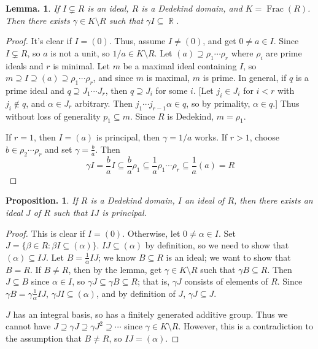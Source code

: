 \documentclass[11pt, a4paper]{memoir}
\DeclareMathOperator{\R}{{\mathbb{R}}}
\theoremstyle{change}
\newtheorem{lemma}[theorem]{Lemma.}
\newtheorem{proposition}[theorem]{Proposition.}
\theoremstyle{plain}
\theoremstyle{nonumberplain}
\newtheorem{proof}{Proof}
\DeclareMathOperator{\Frac}{Frac}
\numberwithin{equation}{section}
\begin{document}
\begin{lemma}
    If $I\subsetneq R$ is an ideal, $R$ is a Dedekind domain, and $K=\Frac(R)$.
    Then there exists $\gamma\in K\setminus R$ such that $\gamma I\subseteq\R$.
\end{lemma}
\begin{proof}
    It's clear if $I=(0)$.
    Thus, assume $I\neq (0)$, and get $0\neq a\in I$.
    Since $I\subsetneq R$, so $a$ is not a unit, so $1/a\in K\setminus R$.
    Let $(a)\supseteq\rho_1\cdots\rho_r$ where $\rho_i$ are prime ideals and $r$ is minimal.
    Let $m$ be a maximal ideal containing $I$, so $m\supseteq I\supseteq(a)\supseteq\rho_1\cdots\rho_r$, and since $m$ is maximal, $m$ is prime.
    In general, if $q$ is a prime ideal and $q\supseteq J_1\cdots J_r$, then $q\supseteq J_i$ for some $i$.
    [Let $j_i\in J_i$ for $i<r$ with $j_i\notin q$, and $\alpha\in J_r$ arbitrary.
    Then $j_1\cdots j_{r-1}\alpha\in q$, so by primality, $\alpha\in q$.]
    Thus without loss of generality $p_1\subseteq m$.
    Since $R$ is Dedekind, $m=\rho_1$.

    If $r=1$, then $I=(a)$ is principal, then $\gamma=1/a$ works.
    If $r>1$, choose $b\in\rho_2\cdots\rho_r$ and set $\gamma=\frac{b}{a}$.
    Then
    \begin{equation*}
        \gamma I=\frac{b}{a}I\subseteq\frac{b}{a}\rho_1\subseteq\frac{1}{a}\rho_1\cdots\rho_r\subseteq\frac{1}{a}(a)=R
    \end{equation*}
\end{proof}
\begin{proposition}
    If $R$ is a Dedekind domain, $I$ an ideal of $R$, then there exists an ideal $J$ of $R$ such that $IJ$ is principal.
\end{proposition}
\begin{proof}
    This is clear if $I=(0)$.
    Otherwise, let $0\neq\alpha\in I$.
    Set $J=\{\beta\in R:\beta I\subseteq(\alpha)\}$.
    $IJ\subseteq(\alpha)$ by definition, so we need to show that $(\alpha)\subseteq IJ$.
    Let $B=\frac{1}{\alpha}IJ$; we know $B\subseteq R$ is an ideal; we want to show that $B=R$.
    If $B\neq R$, then by the lemma, get $\gamma\in K\setminus R$ such that $\gamma B\subseteq R$.
    Then $J\subseteq B$ since $\alpha\in I$, so $\gamma J\subseteq\gamma B\subseteq R$; that is, $\gamma J$ consists of elements of $R$.
    Since $\gamma B=\gamma\frac{1}{\alpha} IJ$, $\gamma JI\subseteq(\alpha)$, and by definition of $J$, $\gamma J\subseteq J$.

    $J$ has an integral basis, so has a finitely generated additive group.
    Thus we cannot have $J\supseteq\gamma J\supseteq\gamma J^2\supseteq\cdots$ since $\gamma\in K\setminus R$.
    However, this is a contradiction to the assumption that $B\neq R$, so $IJ=(\alpha)$.
\end{proof}
\end{document}
